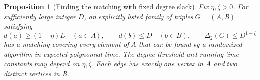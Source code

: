\documentclass[11pt]{article}
\newtheorem{proposition}[theorem]{Proposition}
\theoremstyle{definition}\newtheorem{algorithm}{Algorithm}[section]
\numberwithin{equation}{section}
\theoremstyle{remark}\newtheorem*{remark}{Remark}
\begin{document}
\begin{proposition}[Finding the matching with fixed degree slack]
\label{prop:algorithmic-rank-three-matching}
Fix $\eta,\zeta>0$. For sufficiently large integer $D$, an explicitly
listed family of triples $G=(A,B)$ satisfying
\[
 d(a)\ge(1+\eta)D\quad(a\in A),\qquad
 d(b)\le D\quad(b\in B),\qquad
 \Delta_2(G)\le D^{1-\zeta}
\]
has a matching covering every element of $A$ that can be found by a randomized algorithm in expected polynomial time. The degree threshold and running-time
constants may depend on $\eta,\zeta$. Each edge has exactly one vertex
in $A$ and two distinct vertices in $B$.
\end{proposition}
\end{document}
